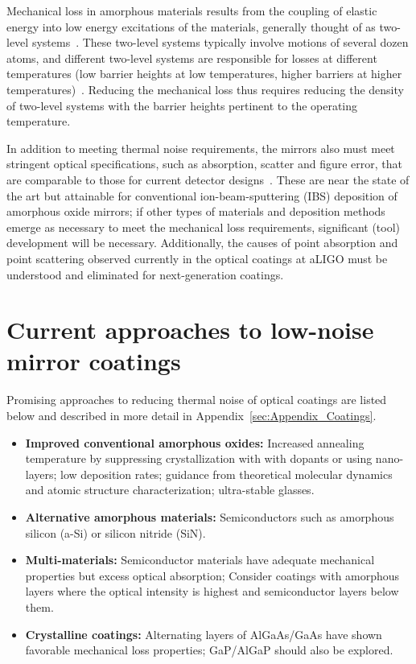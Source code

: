 Mechanical loss in amorphous materials results from the coupling of elastic energy into low energy excitations of the materials, generally thought of as two-level systems~\cite{braginsky1985systems,bommel1956dislocations}.
These two-level systems typically involve motions of several dozen atoms, and different two-level systems are responsible for losses at different temperatures (low barrier heights at low temperatures, higher barriers at higher temperatures)~\cite{hamdan2014molecular,trinastic2016molecular}. Reducing the mechanical loss thus requires reducing the density of two-level systems with the barrier heights pertinent to the operating temperature. 

In addition to meeting thermal noise requirements, the mirrors also must meet stringent optical specifications, such as absorption, scatter and figure error, that are comparable to those for current detector designs~\cite{AdvancedVirgo2015, AdvancedLIGO2015}. These are near the state of the art but attainable for conventional ion-beam-sputtering (IBS) deposition of amorphous oxide mirrors; if other types of materials and deposition methods emerge as necessary to meet the mechanical loss requirements, significant (tool) development will be necessary. Additionally, the causes of point absorption and point scattering observed currently in the optical coatings at aLIGO must be understood and eliminated for next-generation coatings. 

\section{Current approaches to low-noise mirror coatings}

Promising approaches to reducing thermal noise of optical coatings are listed below and described in more detail in Appendix~\ref{sec:Appendix_Coatings}.
\begin{itemize}
    \item\textbf{Improved conventional amorphous oxides:} Increased annealing temperature by suppressing crystallization with with dopants or using nano-layers; low deposition rates; guidance from theoretical molecular dynamics and atomic structure characterization; ultra-stable glasses.
    \item\textbf{Alternative amorphous materials:} Semiconductors such as amorphous silicon (a-Si) or silicon nitride (SiN).
    \item\textbf{Multi-materials:} Semiconductor materials have adequate mechanical properties but excess optical absorption; Consider coatings with amorphous layers where the optical intensity is highest and semiconductor layers below them.
    \item\textbf{Crystalline coatings:} Alternating layers of AlGaAs/GaAs have shown favorable mechanical loss properties; GaP/AlGaP should also be explored.
\end{itemize}

